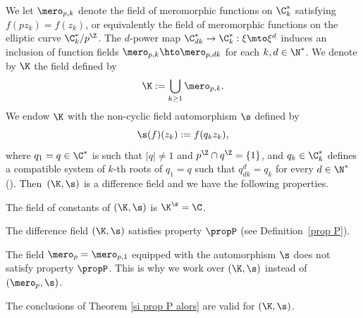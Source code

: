 We let $\mero_{p,k}$ denote the field of meromorphic functions on $\C^{*}_k$ satisfying $f(pz_k)=f(z_k)$, or equivalently the field of meromorphic functions on the elliptic curve $\C^{*}_k/p^\Z$. The $d$-power map $\C^{*}_{dk}\to \C^{*}_k:\xi\mto \xi^d$ induces an inclusion of function fields $\mero_{p,k}\hto\mero_{p,dk}$ for each $k,d\in\N^{*}$. We denote by $\K$ the field defined by
\[
\K:=
\bigcup_{k \geq 1} \mero_{p,k}.
\]
We endow $\K$ with the non-cyclic field automorphism
$\s$ defined by
\begin{equation}\label{sigma-def}
\s (f)(z_k):=f(q_kz_k),
\end{equation}
where $q_1=q\in \C^{*}$ is such that $\vert q \vert \neq 1$ and $p^{\Z} \cap q^{\Z}=\{1\}$, and $q_k\in\C^{*}_k$ defines a compatible system of $k$-th roots of $q_1=q$ such that $q_{dk}^d=q_k$ for every $d\in\N^{*}$ (\cf \cite[\S 2]{Hen97}).
Then~$(\K,\s)$ is a difference field and we have the following properties.

\begin{prop}
The field of constants of $(\K,\s)$ is
\hbox{$\K^{\s}=\C$}.
\end{prop}

\begin{prop}
The difference field $(\K,\s)$ satisfies property $\propP$ (see Definition~\ref{prop P}).
\end{prop}

\begin{remark}
The field $\mero_{p}=\mero_{p,1}$ equipped with the automorphism $\s$ does not satisfy property $\propP$. This is why we work over $(\K,\s)$ instead of $(\mero_{p},\s)$.
\end{remark}

\begin{coro}\label{coro1}
The conclusions of Theorem \ref{si prop P alors} are valid for $(\K,\s)$.
\end{coro}

